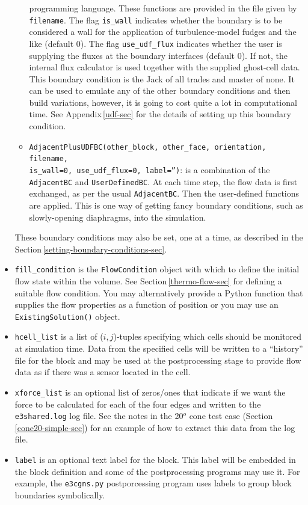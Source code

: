\documentclass[12pt,a4paper,twoside]{article}
\begin{document}
\begin{itemize}
\begin{itemize}
       programming language.
       These functions are provided in the file given by \texttt{filename}.
       The flag \texttt{is\_wall} indicates whether the boundary is to be considered
       a wall for the application of turbulence-model fudges and the like (default 0).
       The flag \texttt{use\_udf\_flux} indicates whether the user is supplying
       the fluxes at the boundary interfaces (default 0).  
       If not, the internal flux calculator is used together with the supplied ghost-cell data.
       This boundary condition is the Jack of all trades and master of none.
       It can be used to emulate any of the other boundary conditions and then build
       variations, however, it is going to cost quite a lot in computational time.
       See Appendix\,\ref{udf-sec} for the details of setting up this boundary condition.
    \item \texttt{AdjacentPlusUDFBC(other\_block, other\_face, orientation, filename, \\is\_wall=0, use\_udf\_flux=0, label='')}: 
       is a combination of the \texttt{AdjacentBC} and \texttt{UserDefinedBC}.
       At each time step, the flow data is first exchanged, as per the usual
       \texttt{AdjacentBC}.  Then the user-defined functions are applied.
       This is one way of getting fancy boundary conditions, such as slowly-opening diaphragms,
       into the simulation.
  \end{itemize}
  These boundary conditions may also be set, one at a time, as described in the 
  Section\,\ref{setting-boundary-conditions-sec}.
\item \texttt{fill\_condition} is the \texttt{FlowCondition} object with which to
  define the initial flow state within the volume.
  See Section\,\ref{thermo-flow-sec} for defining a suitable flow condition.
  You may alternatively provide a Python function that supplies the flow properties as
  a function of position or you may use an \texttt{ExistingSolution()} object.
\item \texttt{hcell\_list} is a list of ($i,j$)-tuples specifying which
  cells should be monitored at simulation time.
  Data from the specified cells will be written to a ``history'' file for the
  block and may be used at the postprocessing stage to provide flow data as if
  there was a sensor located in the cell.
\item \texttt{xforce\_list} is an optional list of zeros/ones that indicate if we
  want the force to be calculated for each of the four edges and written to the 
  \texttt{e3shared.log} log file.
  See the notes in the 20$^o$ cone test case (Section\,\ref{cone20-simple-sec}) for an
  example of how to extract this data from the log file. 
\item \texttt{label} is an optional text label for the block.  This label
  will be embedded in the block definition and some of the postprocessing
  programs may use it.
  For example, the \texttt{e3cgns.py} postporcessing program uses labels to group block boundaries symbolically.
\end{itemize}
\end{document}

